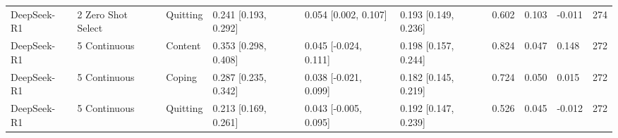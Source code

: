 \begin{tabular}{llllllllll}
DeepSeek-R1 & 2 Zero Shot Select & Quitting & 0.241 [0.193, 0.292] & 0.054 [0.002, 0.107] & 0.193 [0.149, 0.236] & 0.602 & 0.103 & -0.011 & 274 \\
DeepSeek-R1 & 5 Continuous & Content & 0.353 [0.298, 0.408] & 0.045 [-0.024, 0.111] & 0.198 [0.157, 0.244] & 0.824 & 0.047 & 0.148 & 272 \\
DeepSeek-R1 & 5 Continuous & Coping & 0.287 [0.235, 0.342] & 0.038 [-0.021, 0.099] & 0.182 [0.145, 0.219] & 0.724 & 0.050 & 0.015 & 272 \\
DeepSeek-R1 & 5 Continuous & Quitting & 0.213 [0.169, 0.261] & 0.043 [-0.005, 0.095] & 0.192 [0.147, 0.239] & 0.526 & 0.045 & -0.012 & 272 \\
\bottomrule
\end{tabular}
